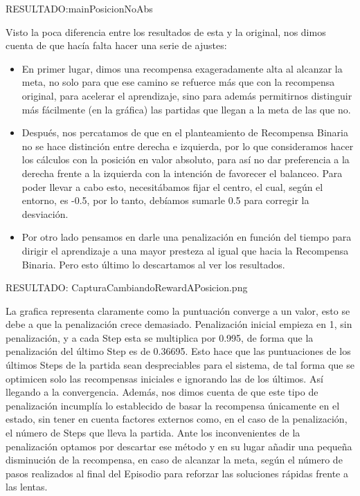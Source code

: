  RESULTADO:mainPosicionNoAbs

Visto la poca diferencia entre los resultados de esta y la original, nos dimos cuenta de que hacía falta hacer una serie de ajustes:

\begin{itemize}
    \item En primer lugar, dimos una recompensa exageradamente alta al alcanzar la meta, no solo para que ese camino se refuerce más que con la recompensa original, para acelerar el aprendizaje, sino para además permitirnos distinguir más fácilmente (en la gráfica) las partidas que llegan a la meta de las que no.  
    \item Después, nos percatamos de que en el planteamiento de Recompensa Binaria no se hace distinción entre derecha e izquierda, por lo que consideramos hacer los cálculos con la posición en valor absoluto, para así no dar preferencia a la derecha frente a la izquierda con la intención de favorecer el balanceo.
     Para poder llevar a cabo esto, necesitábamos fijar el centro, el cual, según el entorno, es -0.5, por lo tanto, debíamos sumarle 0.5 para corregir la desviación.
    \item Por otro lado pensamos en darle una penalización en función del tiempo para dirigir el aprendizaje a una mayor presteza al igual que hacia la Recompensa Binaria. Pero esto último lo descartamos al ver los resultados.
\end{itemize}
 RESULTADO: CapturaCambiandoRewardAPosicion.png

La grafica representa claramente como la puntuación converge a un valor, esto se debe a que la penalización crece demasiado.
Penalización inicial empieza en 1, sin penalización, y a cada Step esta se multiplica por 0.995, de forma que la penalización del último Step es de 0.36695. Esto hace que las puntuaciones de los últimos Steps de la partida sean despreciables para el sistema, de tal forma que se optimicen solo las recompensas iniciales e ignorando las de los últimos. Así llegando a la convergencia. 
Además, nos dimos cuenta de que este tipo de penalización incumplía lo establecido de basar la recompensa únicamente en el estado, sin tener en cuenta factores externos como, en el caso de la penalización, el número de Steps que lleva la partida.
Ante los inconvenientes de la penalización optamos por descartar ese método y en su lugar añadir una pequeña disminución de la recompensa, en caso de alcanzar la meta, según el número de pasos realizados al final del Episodio para reforzar las soluciones rápidas frente a las lentas.

